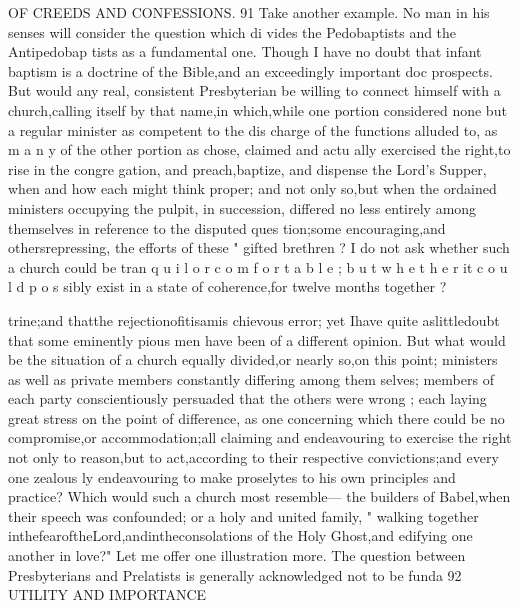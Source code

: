\documentclass[
]{book}
\begin{document}
OF CREEDS AND CONFESSIONS. 91
Take another example. No man in his senses will consider the question which di vides the Pedobaptists and the Antipedobap tists as a fundamental one. Though I have no doubt that infant baptism is a doctrine of the Bible,and an exceedingly important doc
prospects. But would any real, consistent Presbyterian be willing to connect himself with a church,calling itself by that name,in which,while one portion considered none but a regular minister as competent to the dis charge of the functions alluded to, as m a n y of
the other portion as chose, claimed and actu ally exercised the right,to rise in the congre
gation, and preach,baptize, and dispense the Lord's Supper, when and how each might think proper; and not only so,but when the
ordained ministers occupying the pulpit, in succession, differed no less entirely among themselves in reference to the disputed ques
tion;some encouraging,and othersrepressing, the efforts of these " gifted brethren ? I do not ask whether such a church could be tran
q u i l o r c o m f o r t a b l e ; b u t w h e t h e r it c o u l d p o s sibly exist in a state of coherence,for twelve months together ?

trine;and thatthe rejectionofitisamis
chievous error; yet Ihave quite aslittledoubt that some eminently pious men have been of a different opinion. But what would be the situation of a church equally divided,or nearly
so,on this point; ministers as well as private members constantly differing among them
selves; members of each party conscientiously persuaded that the others were wrong ; each laying great stress on the point of difference, as one concerning which there could be no
compromise,or accommodation;all claiming and endeavouring to exercise the right not only to reason,but to act,according to their respective convictions;and every one zealous ly endeavouring to make proselytes to his own principles and practice? Which would such a church most resemble--- the builders of Babel,when their speech was confounded; or a holy and united family, " walking together inthefearoftheLord,andintheconsolations
of the Holy Ghost,and edifying one another in love?"
Let me offer one illustration more. The question between Presbyterians and Prelatists is generally acknowledged not to be funda
92 UTILITY AND IMPORTANCE
\end{document}
